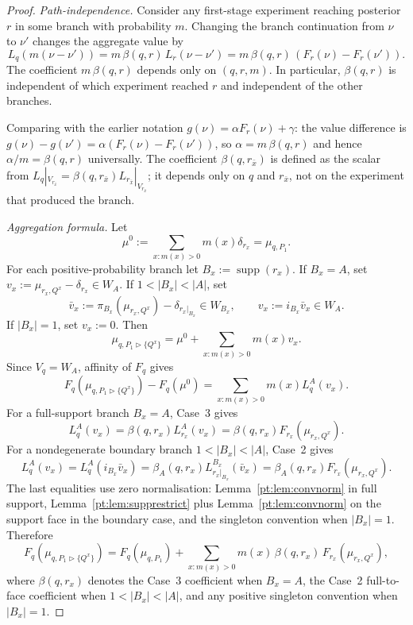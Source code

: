 \documentclass[11pt,a4paper]{article}
\theoremstyle{definition}
\newcommand{\1}{\mathbf 1}
\begin{document}
\begin{proof}
\emph{Path-independence.}  Consider any first-stage experiment reaching posterior $r$ in some branch with probability
$m$.  Changing the branch continuation from $\nu$ to $\nu'$ changes the aggregate value by
\[
L_q(m(\nu-\nu'))=m\,\beta(q,r)\,L_r(\nu-\nu')=m\,\beta(q,r)\,(F_r(\nu)-F_r(\nu')).
\]
The coefficient $m\,\beta(q,r)$ depends only on $(q,r,m)$.  In particular, $\beta(q,r)$ is independent of which
experiment reached $r$ and independent of the other branches.

Comparing with the earlier notation $g(\nu)=\alpha F_r(\nu)+\gamma$: the value difference is
$g(\nu)-g(\nu')=\alpha(F_r(\nu)-F_r(\nu'))$, so $\alpha=m\,\beta(q,r)$ and hence $\alpha/m=\beta(q,r)$ universally.
The coefficient $\beta(q,r_{\bar x})$ is defined as the scalar from $L_q|_{V_{r_{\bar x}}}=\beta(q,r_{\bar x})L_{r_{\bar x}}|_{V_{r_{\bar x}}}$;
it depends only on $q$ and $r_{\bar x}$, not on the experiment that produced the branch.

\emph{Aggregation formula.}  Let
\[
\mu^0:=\sum_{x:m(x)>0}m(x)\delta_{r_x}=\mu_{q,P_1}.
\]
For each positive-probability branch let $B_x:=\operatorname{supp}(r_x)$.  If $B_x=A$, set
$v_x:=\mu_{r_x,Q^x}-\delta_{r_x}\in W_A$.  If $1<|B_x|<|A|$, set
\[
\bar v_x:=\pi_{B_x}(\mu_{r_x,Q^x})-\delta_{r_x|_{B_x}}\in W_{B_x},
\qquad
v_x:=i_{B_x}\bar v_x\in W_A.
\]
If $|B_x|=1$, set $v_x:=0$.  Then
\[
\mu_{q,P_1\triangleright\{Q^x\}}=\mu^0+\sum_{x:m(x)>0}m(x)v_x.
\]
Since $V_q=W_A$, affinity of $F_q$ gives
\[
F_q(\mu_{q,P_1\triangleright\{Q^x\}})-F_q(\mu^0)
=\sum_{x:m(x)>0}m(x)L_q^A(v_x).
\]
For a full-support branch $B_x=A$, Case~3 gives
\[
L_q^A(v_x)=\beta(q,r_x)L_{r_x}^A(v_x)
=\beta(q,r_x)F_{r_x}(\mu_{r_x,Q^x}).
\]
For a nondegenerate boundary branch $1<|B_x|<|A|$, Case~2 gives
\[
L_q^A(v_x)=L_q^A(i_{B_x}\bar v_x)
=\beta_A(q,r_x)L_{r_x|_{B_x}}^{B_x}(\bar v_x)
=\beta_A(q,r_x)F_{r_x}(\mu_{r_x,Q^x}).
\]
The last equalities use zero normalisation: Lemma~\ref{pt:lem:convnorm} in full support, Lemma~\ref{pt:lem:supprestrict} plus
Lemma~\ref{pt:lem:convnorm} on the support face in the boundary case, and the singleton convention when $|B_x|=1$.  Therefore
\[
F_q(\mu_{q,P_1\triangleright\{Q^x\}})
=
F_q(\mu_{q,P_1})+\sum_{x:m(x)>0}m(x)\,\beta(q,r_x)\,F_{r_x}(\mu_{r_x,Q^x}),
\]
where $\beta(q,r_x)$ denotes the Case~3 coefficient when $B_x=A$, the Case~2 full-to-face coefficient when
$1<|B_x|<|A|$, and any positive singleton convention when $|B_x|=1$.
\end{proof}
\end{document}
